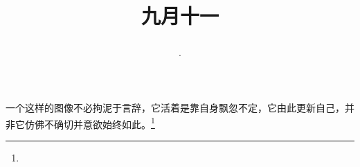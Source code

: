 \title{\date[d=13,m=10,y=2024][year:cn-y,年,month:cn,day:cn,日,·,weekday]·九月十一 }
一个这样的图像不必拘泥于言辞，它活着是靠自身飘忽不定，它由此更新自己，并非它仿佛不确切并意欲始终如此。\footnote{ }


